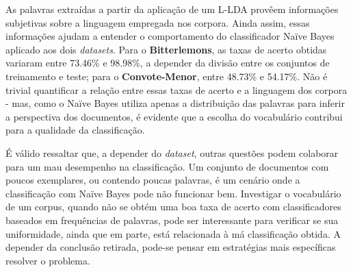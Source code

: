



As palavras extraídas a partir da aplicação de um L-LDA provêem informações subjetivas sobre a linguagem empregada nos corpora. Ainda assim, essas informações ajudam a entender o comportamento do classificador Naïve Bayes aplicado aos dois \emph{datasets}. Para o \textbf{Bitterlemons}, as taxas de acerto obtidas variaram entre 73.46\% e 98.98\%, a depender da divisão entre os conjuntos de treinamento e teste; para o \textbf{Convote-Menor}, entre 48.73\% e 54.17\%. Não é trivial quantificar a relação entre essas taxas de acerto e a linguagem dos corpora - mas, como o Naïve Bayes utiliza apenas a distribuição das palavras para inferir a perspectiva dos documentos, é evidente que a escolha do vocabulário contribui para a qualidade da classificação.




É válido ressaltar que, a depender do \emph{dataset}, outras questões podem colaborar para um mau desempenho na classificação. Um conjunto de documentos com poucos exemplares, ou contendo poucas palavras, é um cenário onde a classificação com Naïve Bayes pode não funcionar bem. Investigar o vocabulário de um corpus, quando não se obtém uma boa taxa de acerto com classificadores baseados em frequências de palavras, pode ser interessante para verificar se sua uniformidade, ainda que em parte, está relacionada à má classificação obtida. A depender da conclusão retirada, pode-se pensar em estratégias mais específicas resolver o problema. 
 




